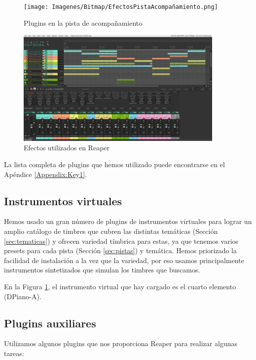 \begin{figure}[h]
    \centering
    \texttt{[image: Imagenes/Bitmap/EfectosPistaAcompañamiento.png]}
    \caption{Plugins en la pista de acompañamiento}
    \label{fig:Efectos-acompañamiento}
\end{figure}

\begin{figure}[h]
    \centering
    \includegraphics[width = 0.9\textwidth]{Imagenes/Bitmap/ArregloReaperMixer.png}
    \caption{Efectos utilizados en Reaper}
    \label{fig:ArregloReaperMixer}
\end{figure}

La lista completa de plugins que hemos utilizado puede encontrarse en el Apéndice \ref{Appendix:Key1}.

    \subsection{Instrumentos virtuales}\label{subsubsec:bluearp}
Hemos usado un gran número de plugins de instrumentos virtuales para lograr un amplio catálogo de timbres que cubren las distintas temáticas (Sección \ref{sec:tematicas}) y ofrecen variedad tímbrica para estas, ya que tenemos varios presets para cada pista (Sección \ref{sec:pistas}) y temática. Hemos priorizado la facilidad de instalación a la vez que la variedad, por eso usamos principalmente instrumentos sintetizados que simulan los timbres que buscamos.

En la Figura \ref{fig:Efectos-acompañamiento}, el instrumento virtual que hay cargado es el cuarto elemento (DPiano-A).

\subsection{Plugins auxiliares}\label{subsubsec:bluearp}
Utilizamos algunos plugins que nos proporciona Reaper para realizar algunas tareas:

